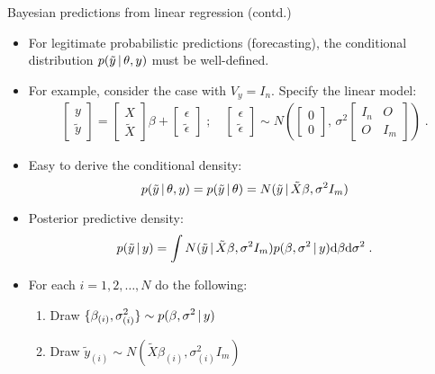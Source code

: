 \begin{frame}{Bayesian predictions from linear regression (contd.)}
 
 \begin{itemize}\setlength{\itemsep}{0.cm}
  \item \vskip -2mm For legitimate probabilistic predictions (forecasting), the conditional distribution $p(\tilde{y}\,|\, \theta, y)$ must be well-defined.
  
  \item For example, consider the case with $V_y = I_n$. Specify the linear model:
\begin{align*}
 \begin{bmatrix} y \\ \tilde{y} \end{bmatrix} = \begin{bmatrix} X \\ \tilde{X} \end{bmatrix}\beta + \begin{bmatrix} \epsilon \\ \tilde{\epsilon} \end{bmatrix}\;;\quad \begin{bmatrix} \epsilon \\ \tilde{\epsilon} \end{bmatrix} \sim N\left(\begin{bmatrix} 0 \\ 0 \end{bmatrix},\, \sigma^2\begin{bmatrix} I_n & O \\ O & I_m \end{bmatrix}\right)\; .  
\end{align*}
  
  \item Easy to derive the conditional density:
\[
 p(\tilde{y}\,|\, \theta, y) =  p(\tilde{y}\,|\, \theta) = N(\tilde{y}\,|\, \tilde{X}\beta, \sigma^2 I_m)
\]

\item Posterior predictive density:
\[
 p(\tilde{y}\,|\, y) = \int N(\tilde{y}\,|\, \tilde{X}\beta, \sigma^2 I_m) p(\beta, \sigma^2\,|\, y) \mbox{d}\beta \mbox{d}\sigma^2\; .
\]

\item For each $i=1,2,\ldots,N$ do the following: 
 \begin{enumerate}\setlength{\itemsep}{0.25cm}
  \item Draw $\displaystyle \{\beta_{(i)},\sigma^2_{(i)}\} \sim p(\beta,\sigma^2\,|\, y)$
  \item Draw $\displaystyle \tilde{y}_{(i)} \sim N(\tilde{X}\beta_{(i)}, \sigma^2_{(i)} I_m)$
 \end{enumerate}
 \end{itemize}

\end{frame}

